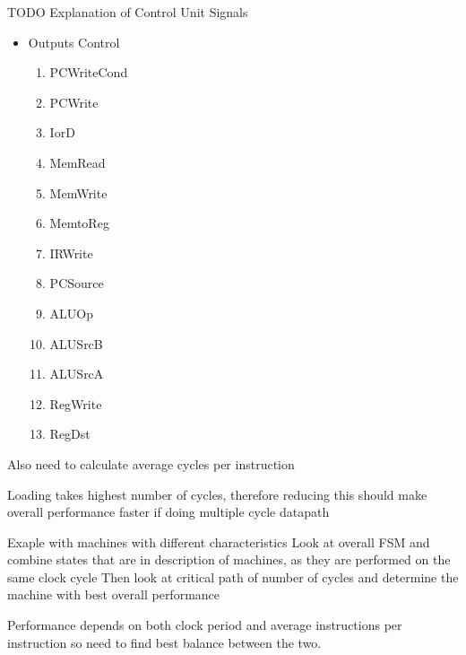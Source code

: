 \documentclass{article}
\begin{document}
		TODO
		Explanation of Control Unit Signals
		\begin{itemize}
			\item Outputs Control
			\begin{enumerate}
				\item PCWriteCond
				\item PCWrite
				\item IorD
				\item MemRead
				\item MemWrite
				\item MemtoReg
				\item IRWrite
				\item PCSource
				\item ALUOp
				\item ALUSrcB
				\item ALUSrcA
				\item RegWrite
				\item RegDst
			\end{enumerate}
		\end{itemize}
		
	Also need to calculate average cycles per instruction

	Loading takes highest number of cycles, therefore reducing this should make overall performance faster if doing multiple cycle datapath

	Exaple with machines with different characteristics
		Look at overall FSM and combine states that are in description of machines, as they are performed on the same clock cycle
		Then look at critical path of number of cycles and determine the machine with best overall performance 

	Performance depends on both clock period and average instructions per instruction so need to find best balance between the two.
\end{document}
